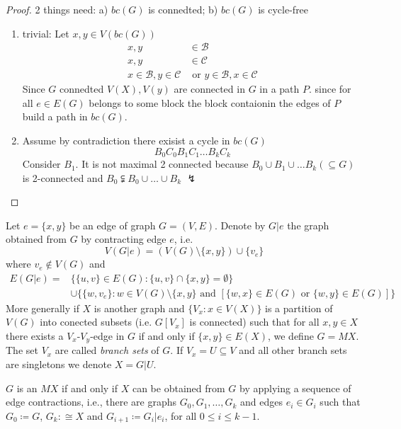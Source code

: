 \documentclass[aagt.tex]{subfiles}
\begin{document}
\begin{proof}
  2 things need: a) $bc(G)$ is connedted; b) $bc(G)$ is cycle-free
  \begin{enumerate}[label=(\alph*)]
    \item trivial: Let $x,y \in V(bc(G))$\\
    \begin{align*}
      x,y &\in \mathcal{B} \\
      x,y &\in \mathcal{C} \\
      x \in \mathcal{B}, y \in \mathcal{C} &\text{ or } y \in \mathcal{B}, x \in \mathcal{C}
    \end{align*}
    Since $G$ connedted $V(X),V(y)$ are connected in $G$ in a path $P$.
    since for all $e \in E(G)$ belongs to some block the block contaionin the edges of $P$ build a path in $bc(G)$.
    \item Assume by contradiction there exisist a cycle in $bc(G)$
    \[ B_0 C_0 B_1 C_1 \dots B_k C_k \]
    Consider $B_1$. It is not maximal 2 connected because $B_0 \cup B_1 \cup \dots B_k (\subseteq G)$ is 2-connected and $B_0 \subsetneqq B_0 \cup \dots \cup B_k$ $\lightning$
  \end{enumerate}
\end{proof}

\begin{defi*}
  Let $e = \{x,y\}$ be an edge of graph $G=(V,E)$.
  Denote by $G|e$ the graph obtained from $G$ by contracting edge $e$, i.e.
  \[ V(G|e) = (V(G) \setminus \{x,y\}) \cup \{v_e\} \]
  where $v_e \notin V(G)$ and
  \begin{align*}
    E(G|e) = &\{ \{u,v\} \in E(G): \{u,v\} \cap \{x,y\} = \emptyset \} \\
    &\cup \{ \{w,v_e\}: w \in V(G)\setminus \{x,y\} \text{ and } [ \{w,x\} \in E(G) \text{ or } \{w,y\} \in E(G)] \}
  \end{align*}
  More generally if $X$ is another graph and $\{V_x: x \in V(X)\}$ is a partition of $V(G)$ into conected subsets (i.e. $G[V_x]$ is connected) such that for all $x,y \in X$ there exists a $V_x$-$V_y$-edge in $G$ if and only if $\{x,y\} \in E(X)$, we define $G = MX$.
  The set $V_x$ are called \emph{branch sets} of $G$.
  If $V_x = U \subseteq V$ and all other branch sets are singletons we denote $X = G|U$.
\end{defi*}

\begin{prop}[2.5]
  $G$ is an $MX$ if and only if $X$ can be obtained from $G$ by applying a sequence of edge contractions, i.e.,
  there are graphs $G_0,G_1,\dots,G_k$ and edges $e_i \in G_i$ such that $G_0 \coloneqq G$, $G_k :\cong X$ and $G_{i+1} \coloneqq G_i|e_i$, for all $0 \leq i \leq k-1$.
\end{prop}
\end{document}
